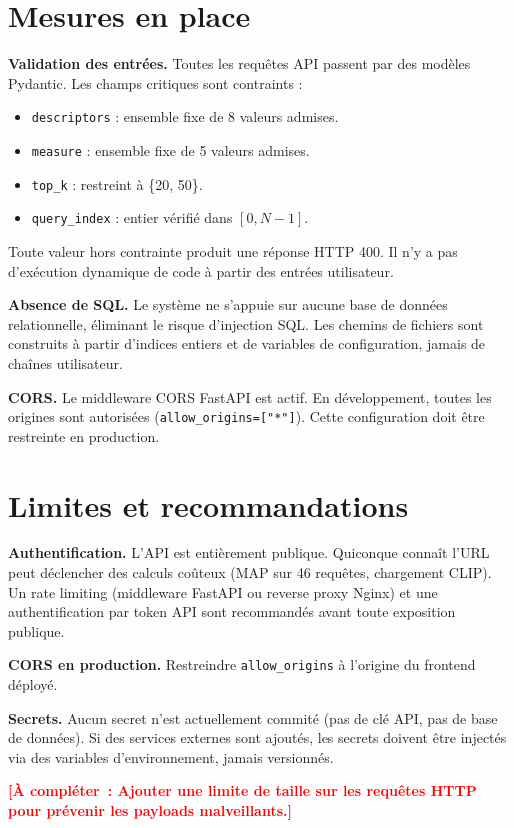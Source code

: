 \documentclass[12pt,a4paper]{report}
\newcommand{\todo}[1]{\textcolor{red}{\textbf{[À compléter~: #1]}}}
\begin{document}
\section{Mesures en place}

\textbf{Validation des entrées.} Toutes les requêtes API passent par des modèles Pydantic. Les champs critiques sont contraints :
\begin{itemize}
  \item \texttt{descriptors} : ensemble fixe de 8 valeurs admises.
  \item \texttt{measure} : ensemble fixe de 5 valeurs admises.
  \item \texttt{top\_k} : restreint à \{20, 50\}.
  \item \texttt{query\_index} : entier vérifié dans $[0, N-1]$.
\end{itemize}
Toute valeur hors contrainte produit une réponse HTTP 400. Il n'y a pas d'exécution dynamique de code à partir des entrées utilisateur.

\textbf{Absence de SQL.} Le système ne s'appuie sur aucune base de données relationnelle, éliminant le risque d'injection SQL. Les chemins de fichiers sont construits à partir d'indices entiers et de variables de configuration, jamais de chaînes utilisateur.

\textbf{CORS.} Le middleware CORS FastAPI est actif. En développement, toutes les origines sont autorisées (\texttt{allow\_origins=["*"]}). Cette configuration doit être restreinte en production.

\section{Limites et recommandations}

\textbf{Authentification.} L'API est entièrement publique. Quiconque connaît l'URL peut déclencher des calculs coûteux (MAP sur 46 requêtes, chargement CLIP). Un rate limiting (middleware FastAPI ou reverse proxy Nginx) et une authentification par token API sont recommandés avant toute exposition publique.

\textbf{CORS en production.} Restreindre \texttt{allow\_origins} à l'origine du frontend déployé.

\textbf{Secrets.} Aucun secret n'est actuellement commité (pas de clé API, pas de base de données). Si des services externes sont ajoutés, les secrets doivent être injectés via des variables d'environnement, jamais versionnés.

\todo{Ajouter une limite de taille sur les requêtes HTTP pour prévenir les payloads malveillants.}
\end{document}
